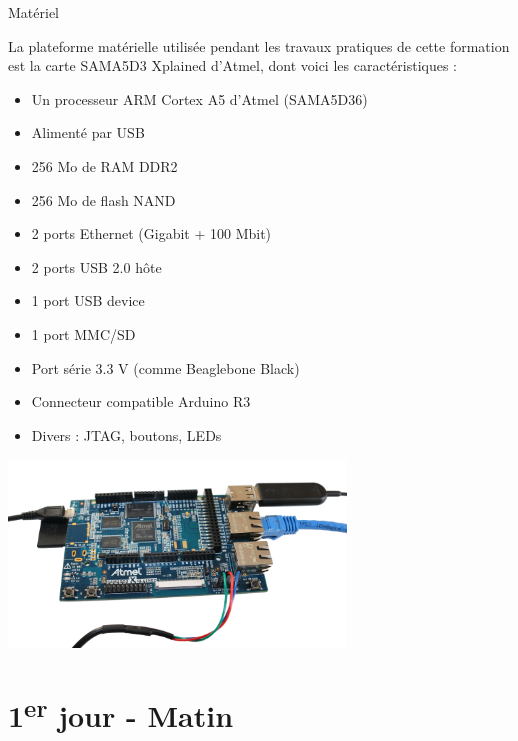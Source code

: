 \documentclass[a4paper,12pt,obeyspaces,spaces,hyphens]{article}
\begin{document}
\feagendatwocolumn
{Matériel}
{
  La plateforme matérielle utilisée pendant les travaux pratiques de
  cette formation est la carte {SAMA5D3 Xplained d'Atmel}, dont voici les
  caractéristiques :

  \begin{itemize}
  \item Un processeur ARM Cortex A5 d'Atmel (SAMA5D36)
  \item Alimenté par USB
  \item 256 Mo de RAM DDR2
  \item 256 Mo de flash NAND
  \item 2 ports Ethernet (Gigabit + 100 Mbit)
  \item 2 ports USB 2.0 hôte
  \item 1 port USB device
  \item 1 port MMC/SD
  \item Port série 3.3 V (comme Beaglebone Black)
  \item Connecteur compatible Arduino R3
  \item Divers : JTAG, boutons, LEDs
  \end{itemize}
}
{}
{
  \begin{center}
    \includegraphics[height=5cm]{../slides/xplained-board/xplained-board.png}
  \end{center}
}

\section{1\textsuperscript{er} jour - Matin}
\end{document}
